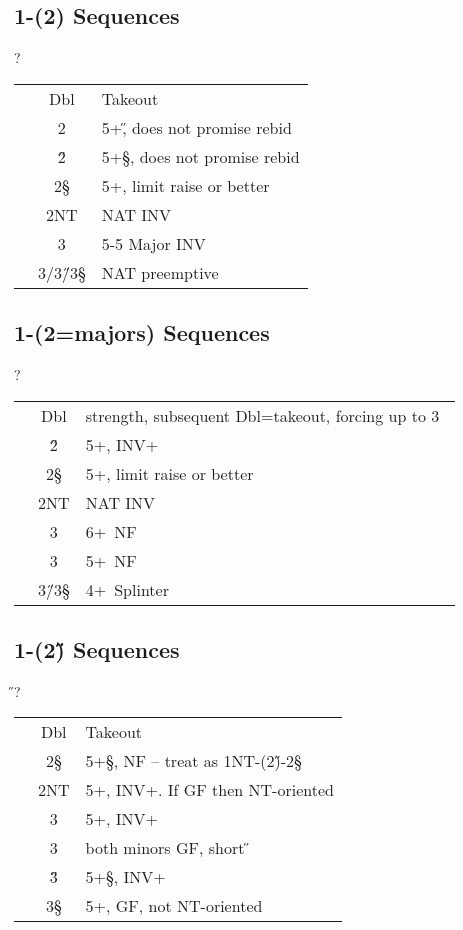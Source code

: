\subsection{1\D-(2\C) Sequences}

\begin{bidding}
\>\D{}\C\>?
\end{bidding}

\begin{longtable}{C{\linklength} C{\bidlength} l}
& Dbl & Takeout \\
& 2\D & 5+\H, does not promise rebid \\
& 2\H & 5+\S, does not promise rebid \\
& 2\S & 5+\D, limit raise or better \\
& 2NT & NAT INV \\
& 3\C & 5-5 Major INV \\
& 3\D/3\H/3\S & NAT preemptive \\  
\end{longtable}


\subsection{1\D-(2\D=majors) Sequences}

\begin{bidding}
\>\D{}\D\>?
\end{bidding}

\begin{longtable}{C{\linklength} C{\bidlength} l}
& Dbl & strength, subsequent Dbl=takeout, forcing up to 3\D\ \\
& 2\H & 5+\C, INV+ \\
& 2\S & 5+\D, limit raise or better \\
& 2NT & NAT INV \\
& 3\C & 6+\C\ NF \\
& 3\D & 5+\D\ NF \\
& 3\H/3\S & 4+\D\ Splinter \\  
\end{longtable}

\subsection{1\D-(2\H) Sequences}

\begin{bidding}
\>\D{}\H\>?
\end{bidding}

\begin{longtable}{C{\linklength} C{\bidlength} l}
& Dbl & Takeout \\
& 2\S & 5+\S, NF -- treat as 1NT-(2\H)-2\S\ \\
& 2NT & 5+\C, INV+. If GF then NT-oriented \\
& 3\C & 5+\D, INV+ \\
& 3\D & both minors GF, short \H \\
& 3\H & 5+\S, INV+ \\
& 3\S & 5+\C, GF, not NT-oriented \\
\end{longtable}

